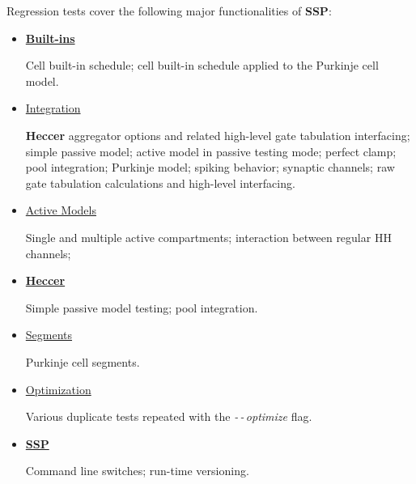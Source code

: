 \documentclass[12pt]{article}
\begin{document}
Regression tests cover the following major functionalities of {\bf SSP}:
\begin{itemize}

\item[]\href{http://www.neurospaces.org/neurospaces_project/ssp/tests/html/specifications/builtins/main.html}{\bf Built-ins}

Cell built-in schedule; cell built-in schedule applied to the Purkinje cell model.

\item[]\href{http://www.neurospaces.org/neurospaces_project/ssp/tests/html/specifications/integration/main.html}{Integration}

{\bf Heccer} aggregator options and related high-level gate tabulation interfacing; simple passive model; active model in passive testing mode; perfect clamp; pool integration; Purkinje model; spiking behavior; synaptic channels; raw gate tabulation calculations and high-level interfacing. 

\item[]\href{http://www.neurospaces.org/neurospaces_project/ssp/tests/html/specifications/integration/active/main.html}{Active Models}

Single and multiple active compartments; interaction between regular HH channels; 

\item[]\href{http://www.neurospaces.org/neurospaces_project/ssp/tests/html/specifications/integration/heccer/main.html}{\bf Heccer}

Simple passive model testing; pool integration.

\item[]\href{http://www.neurospaces.org/neurospaces_project/ssp/tests/html/specifications/integration/segments/main.html}{Segments}

Purkinje cell segments.

\item[]\href{http://www.neurospaces.org/neurospaces_project/ssp/tests/html/specifications/optimization/main.html}{Optimization}

Various duplicate tests repeated with the {\it -\,-\,optimize} flag.

\item[]\href{http://www.neurospaces.org/neurospaces_project/ssp/tests/html/specifications/ssp/main.html}{\bf SSP}

Command line switches; run-time versioning.

\end{itemize}
\end{document}
